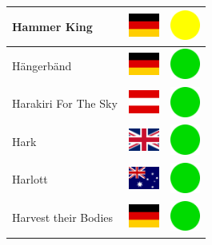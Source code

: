 \documentclass[12pt, a4paper, twoside]{report}
\begin{document}
\begin{center}
\begin{longtable}{|p{5cm}|p{2cm}|p{2cm}|}
 Hammer King                                                & \includegraphics[width=1cm]{../4x3/de} &   \includegraphics[width=1cm]{../likes/m} \\ \hline
 Hängerbänd                                                 & \includegraphics[width=1cm]{../4x3/de} &   \includegraphics[width=1cm]{../likes/y} \\ \hline
 Harakiri For The Sky                                       & \includegraphics[width=1cm]{../4x3/at} &   \includegraphics[width=1cm]{../likes/y} \\ \hline
 Hark                                                       & \includegraphics[width=1cm]{../4x3/gb} &   \includegraphics[width=1cm]{../likes/y} \\ \hline
 Harlott                                                    & \includegraphics[width=1cm]{../4x3/au} &   \includegraphics[width=1cm]{../likes/y} \\ \hline
 Harvest their Bodies                                       & \includegraphics[width=1cm]{../4x3/de} &   \includegraphics[width=1cm]{../likes/y} \\ \hline

\end{longtable}
\end{center}
\end{document}
